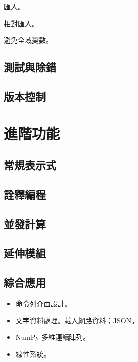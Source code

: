 \documentclass[a4paper,12pt]{book}
\theoremstyle{definition}
\begin{document}
匯入。

相對匯入。

避免全域變數。

\chapter{測試與除錯}
%
\label{c:debug}

\chapter{版本控制}
%
\label{c:version}

\part{進階功能}
%
\label{p:advance}

\chapter{常規表示式}
%
\label{c:regexp}

\chapter{詮釋編程}
%
\label{c:meta}

\chapter{並發計算}
%
\label{c:concurrency}

\chapter{延伸模組}
%
\label{c:extension}

\chapter{綜合應用}
%
\label{c:beyond}

\begin{itemize}

\item 命令列介面設計。

\item 文字資料處理。載入網路資料；JSON。

\item NumPy 多維連續陣列。

\item 線性系統。

\end{itemize}

\backmatter



\end{document}
